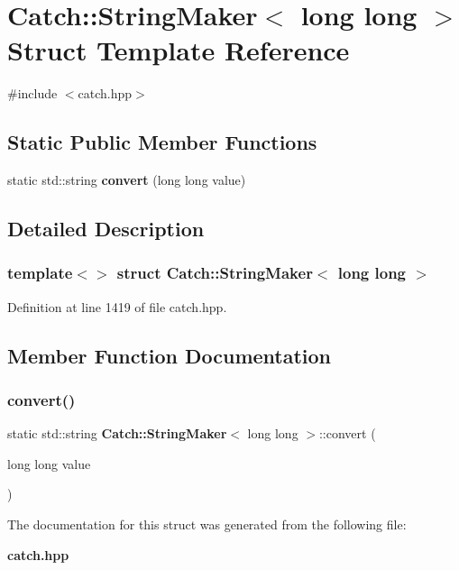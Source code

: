 \section{Catch\+::String\+Maker$<$ long long $>$ Struct Template Reference}
\label{struct_catch_1_1_string_maker_3_01long_01long_01_4}


{\ttfamily \#include $<$catch.\+hpp$>$}

\subsection*{Static Public Member Functions}
\begin{DoxyCompactItemize}
\item 
static std\+::string \textbf{ convert} (long long value)
\end{DoxyCompactItemize}


\subsection{Detailed Description}
\subsubsection*{template$<$$>$\newline
struct Catch\+::\+String\+Maker$<$ long long $>$}



Definition at line 1419 of file catch.\+hpp.



\subsection{Member Function Documentation}
\mbox{\label{struct_catch_1_1_string_maker_3_01long_01long_01_4_a7a58929dca2a14c576d7d6d08bc615d2}} 
\subsubsection{convert()}
{\footnotesize\ttfamily static std\+::string \textbf{ Catch\+::\+String\+Maker}$<$ long long $>$\+::convert (\begin{DoxyParamCaption}\item[{long long}]{value }\end{DoxyParamCaption})\hspace{0.3cm}{\ttfamily [static]}}



The documentation for this struct was generated from the following file\+:\begin{DoxyCompactItemize}
\item 
\textbf{ catch.\+hpp}\end{DoxyCompactItemize}

